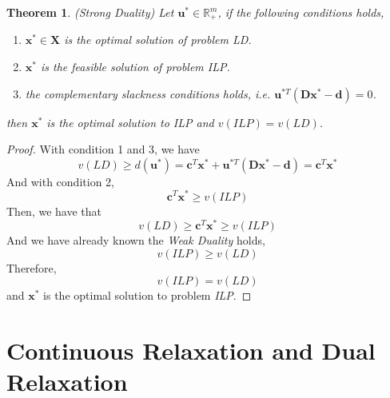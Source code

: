 \documentclass{article}
\newtheorem{thm}{Theorem}
\begin{document}
\begin{thm}
	(Strong Duality) Let $\bm{u}^* \in \mathbb{R}_+^m$, if the following conditions holds,
	\begin{enumerate}
		\item $\bm{x}^* \in \bm{X}$ is the optimal solution of problem \textit{LD}.
		\item $\bm{x}^*$ is the feasible solution of problem \textit{ILP}.
		\item the complementary slackness conditions holds, i.e. $\bm{u}^{*T}(\bm{D}\bm{x}^* - \bm{d}) = 0$.
	\end{enumerate} 
	then $\bm{x}^*$ is the optimal solution to \textit{ILP} and $v(ILP) = v(LD)$.
\end{thm}

\begin{proof}
	With condition 1 and 3, we have 
	\begin{equation}
		v(LD) \geq d(\bm{u}^*) = \bm{c}^T\bm{x}^* + \bm{u}^{*T}(\bm{D}\bm{x}^*-\bm{d}) = \bm{c}^T\bm{x}^*
	\end{equation}
	And with condition 2, 
	\begin{equation}
		\bm{c}^T\bm{x}^* \geq v(ILP)
	\end{equation}
	Then, we have that
	\begin{equation}
		v(LD) \geq \bm{c}^T\bm{x}^* \geq v(ILP)
	\end{equation}
	And we have already known the \textit{Weak Duality} holds,
	\begin{equation}
		v(ILP) \geq v(LD)
	\end{equation}
	Therefore,
	\begin{equation}
		v(ILP) = v(LD)
	\end{equation}
	and $\bm{x}^*$ is the optimal solution to problem \textit{ILP}.
\end{proof}


\section{Continuous Relaxation and Dual Relaxation}
 
\end{document}
